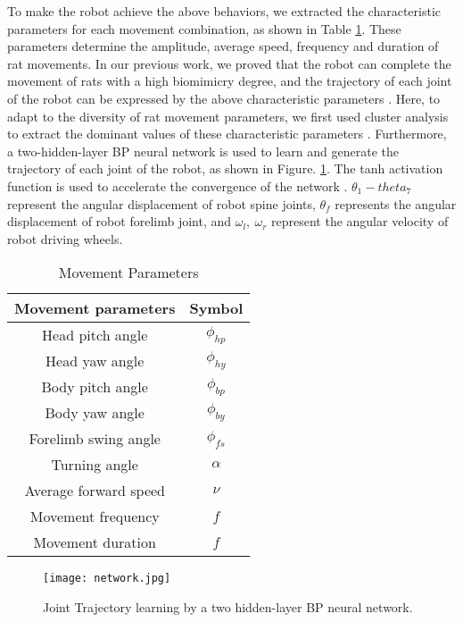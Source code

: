 To make the robot achieve the above behaviors, we extracted the characteristic parameters for each movement combination, as shown in Table \ref{table:Movement Parameters}. These parameters determine the amplitude, average speed, frequency and duration of rat movements. In our previous work, we proved that the robot can complete the movement of rats with a high biomimicry degree, and the trajectory of each joint of the robot can be expressed by the above characteristic parameters \cite{shi-gao-tro-2021}. Here, to adapt to the diversity of rat movement parameters, we first used cluster analysis to extract the dominant values of these characteristic parameters \cite{fraley_how_many_clusters,kaufman_finding_groups}. Furthermore, a two-hidden-layer BP neural network is used to learn and generate the trajectory of each joint of the robot, as shown in Figure. \ref{figure:Joint Trajectory learning by a two hidden-layer BP neural network}. The tanh activation function is used to accelerate the convergence of the network \cite{inohira-generalization}. $\theta_1-theta_7$ represent the angular displacement of robot spine joints, $\theta_f$ represents the angular displacement of robot forelimb joint, and $\omega_l,~\omega_r$ represent the angular velocity of robot driving wheels.

\begin{table}[b]
    \caption{Movement Parameters}
    \centering
    \begin{tabular}{cc}
            \hline
            Movement parameters & Symbol \\
            \hline
            Head pitch angle & $\phi_{hp}$ \\
            Head yaw angle & $\phi_{hy}$ \\
            Body pitch angle & $\phi_{bp}$ \\
            Body yaw angle & $\phi_{by}$ \\
            Forelimb swing angle & $\phi_{fs}$ \\
            Turning angle & $\alpha$ \\
            Average forward speed & $\nu$ \\
            Movement frequency & $f$ \\
            Movement duration & $f$ \\
            \hline
            \end{tabular}
    \label{table:Movement Parameters}
\end{table}

\begin{figure}[h]
    \centering
    \texttt{[image: network.jpg]}
    \caption{Joint Trajectory learning by a two hidden-layer BP neural network.}
    \label{figure:Joint Trajectory learning by a two hidden-layer BP neural network}
\end{figure}

